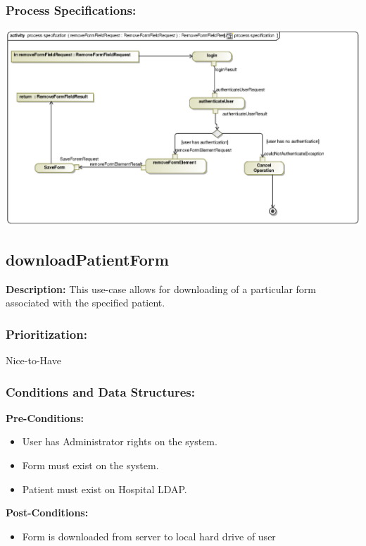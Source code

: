 \subsubsection{Process Specifications:} 
\includegraphics[width=1\linewidth]{./Graphics/FormUseCaseDiagrams/processspecification_RemoveFormField}




\subsection{downloadPatientForm} %
\textbf{Description:}
This use-case allows for downloading of a particular form associated with the specified patient.
\subsubsection{Prioritization:}
Nice-to-Have
\subsubsection{Conditions and Data Structures:}
\textbf{Pre-Conditions:}
\begin{itemize}
	\item User has Administrator rights on the system.
	\item Form must exist on the system.
	\item Patient must exist on Hospital LDAP.
\end{itemize}

\textbf{Post-Conditions:}	
\begin{itemize}
	\item Form is downloaded from server to local hard drive of user
\end{itemize}
